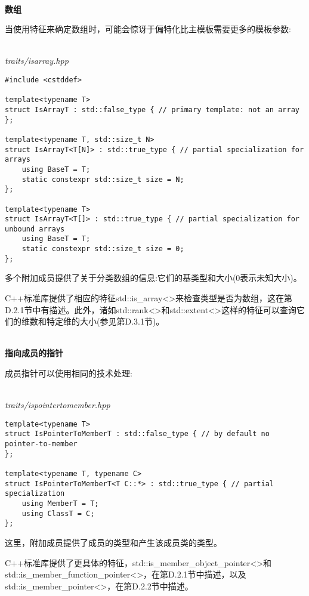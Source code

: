 \hspace*{\fill} \\ %
\noindent
\textbf{数组}

当使用特征来确定数组时，可能会惊讶于偏特化比主模板需要更多的模板参数:

\hspace*{\fill} \\ %
\noindent
\textit{traits/isarray.hpp}
\begin{lstlisting}[style=styleCXX]
#include <cstddef>

template<typename T>
struct IsArrayT : std::false_type { // primary template: not an array
};

template<typename T, std::size_t N>
struct IsArrayT<T[N]> : std::true_type { // partial specialization for arrays
	using BaseT = T;
	static constexpr std::size_t size = N;
};

template<typename T>
struct IsArrayT<T[]> : std::true_type { // partial specialization for unbound arrays
	using BaseT = T;
	static constexpr std::size_t size = 0;
};
\end{lstlisting}

多个附加成员提供了关于分类数组的信息:它们的基类型和大小(0表示未知大小)。

C++标准库提供了相应的特征std::is\_array<>来检查类型是否为数组，这在第D.2.1节中有描述。此外，诸如std::rank<>和std::extent<>这样的特征可以查询它们的维数和特定维的大小(参见第D.3.1节)。

\hspace*{\fill} \\ %
\noindent
\textbf{指向成员的指针}

成员指针可以使用相同的技术处理:

\hspace*{\fill} \\ %
\noindent
\textit{traits/ispointertomember.hpp}
\begin{lstlisting}[style=styleCXX]
template<typename T>
struct IsPointerToMemberT : std::false_type { // by default no pointer-to-member
};

template<typename T, typename C>
struct IsPointerToMemberT<T C::*> : std::true_type { // partial specialization
	using MemberT = T;
	using ClassT = C;
};
\end{lstlisting}

这里，附加成员提供了成员的类型和产生该成员类的类型。

C++标准库提供了更具体的特征，std::is\_member\_object\_pointer<>和std::is\_member\_function\_pointer<>，在第D.2.1节中描述，以及std::is\_member\_pointer<>，在第D.2.2节中描述。

